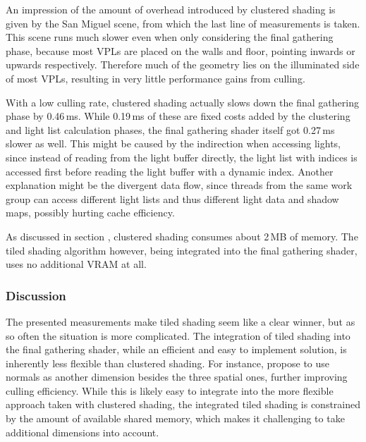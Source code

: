 An impression of the amount of overhead introduced by clustered shading is given by the San Miguel scene, from which the last line of measurements is taken. This scene runs much slower even when only considering the final gathering phase, because most VPLs are placed on the walls and floor, pointing inwards or upwards respectively. Therefore much of the geometry lies on the illuminated side of most VPLs, resulting in very little performance gains from culling.

With a low culling rate, clustered shading actually slows down the final gathering phase by 0.46\,ms. While 0.19\,ms of these are fixed costs added by the clustering and light list calculation phases, the final gathering shader itself got 0.27\,ms slower as well. This might be caused by the indirection when accessing lights, since instead of reading from the light buffer directly, the light list with indices is accessed first before reading the light buffer with a dynamic index. Another explanation might be the divergent data flow, since threads from the same work group can access different light lists and thus different light data and shadow maps, possibly hurting cache efficiency.

As discussed in section , clustered shading consumes about 2\,MB of memory. The tiled shading algorithm however, being integrated into the final gathering shader, uses no additional VRAM at all.

\subsubsection{Discussion}

The presented measurements make tiled shading seem like a clear winner, but as so often the situation is more complicated. The integration of tiled shading into the final gathering shader, while an efficient and easy to implement solution, is inherently less flexible than clustered shading. For instance, \citet{olsson2012clustered} propose to use normals as another dimension besides the three spatial ones, further improving culling efficiency. While this is likely easy to integrate into the more flexible approach taken with clustered shading, the integrated tiled shading is constrained by the amount of available shared memory, which makes it challenging to take additional dimensions into account.

